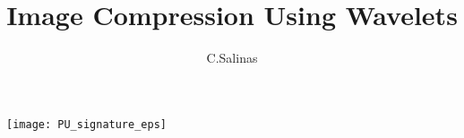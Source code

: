 \documentclass{beamer}
\begin{document}
\title[Wavelet Image Compression]{Image Compression Using Wavelets}

\author[CS]{C.\@ Salinas}

\begin{frame}
  \titlepage
  \begin{center}
    \texttt{[image: PU\_signature\_eps]}
  \end{center}
\end{frame}

% 
% 

% 
% 
\end{document}
